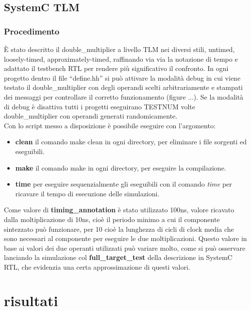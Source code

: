 \documentclass[]{IEEEtran}
\begin{document}
\subsection{SystemC TLM}

\subsubsection{Procedimento}
È stato descritto il double\_multiplier a livello TLM nei diversi stili, untimed, loosely-timed, approximately-timed, raffinando via via la notazione di tempo e adattato il testbench RTL per rendere più significativo il confronto. In ogni progetto dentro il file ``define.hh'' si può attivare la modalità debug in cui viene testato il double\_multiplier con degli operandi scelti arbitrariamente e stampati dei messaggi per controllare il corretto funzionamento (figure ...). Se la modalità di debug è disattiva tutti i progetti eseguirano TESTNUM volte double\_multiplier con operandi generati randomicamente.
\\Con lo script messo a disposizione è possibile eseguire con l'argomento:
\begin{itemize}
    \item \textbf{clean} il comando make clean in ogni directory, per eliminare i file sorgenti ed eseguibili.
    \item \textbf{make} il comando make in ogni directory, per eseguire la compilazione.
    \item \textbf{time} per eseguire sequenzialmente gli eseguibili con il comando \textit{time} per ricavare il tempo di esecuzione delle simulazioni.
\end{itemize}
Come valore di \textbf{timing\_annotation} è stato utilizzato 100ns, valore ricavato dalla moltiplicazione di 10ns, cioè il periodo minimo a cui il componente sintezzato può funzionare, per 10 cioè la lunghezza di cicli di clock media che sono necessari al componente per eseguire le due moltiplicazioni. Questo valore in base ai valori dei due operanti utilizzati può variare molto, come si può osservare lanciando la simulazione col \textbf{full\_target\_test} della descrizione in SystemC RTL, che evidenzia una certa approssimazione di questi valori.




\section{risultati}
\end{document}

